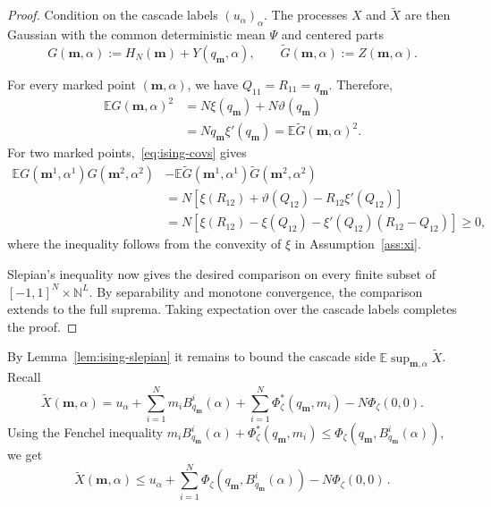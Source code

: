 \documentclass[a4paper,10pt,reqno]{amsart}
\numberwithin{equation}{section}
\newcommand{\dN}{\mathbb{N}}%
\newcommand{\dE}{\mathbb{E}}%
\newcommand{\bfm}{\mathbf{m}}
\begin{document}
	\begin{proof}
		Condition on the cascade labels $(u_\alpha)_\alpha$. The processes
		$X$ and $\widetilde X$ are then Gaussian with the common
		deterministic mean $\Psi$ and centered parts
		\[
		G(\bfm,\alpha)
		:=
		H_N(\bfm)+Y(q_\bfm,\alpha),
		\qquad
		\widetilde G(\bfm,\alpha)
		:=
		Z(\bfm,\alpha).
		\]
		
		For every marked point $(\bfm,\alpha)$, we have
		$Q_{11}=R_{11}=q_\bfm$. Therefore,
		\[
		\begin{aligned}
			\dE G(\bfm,\alpha)^2
			&=
			N\xi(q_\bfm)+N\vartheta(q_\bfm) \\
			&=
			Nq_\bfm\xi'(q_\bfm)
			=
			\dE\widetilde G(\bfm,\alpha)^2.
		\end{aligned}
		\]
		For two marked points,~\eqref{eq:ising-covs} gives
		\[
		\begin{aligned}
			\dE G(\bfm^1,\alpha^1)G(\bfm^2,\alpha^2)
			&-
			\dE\widetilde G(\bfm^1,\alpha^1)
			\widetilde G(\bfm^2,\alpha^2) \\
			&=
			N\left[
			\xi(R_{12})
			+
			\vartheta(Q_{12})
			-
			R_{12}\xi'(Q_{12})
			\right] \\
			&=
			N\left[
			\xi(R_{12})
			-
			\xi(Q_{12})
			-
			\xi'(Q_{12})(R_{12}-Q_{12})
			\right]
			\ge 0,
		\end{aligned}
		\]
		where the inequality follows from the convexity of $\xi$ in
		Assumption~\ref{ass:xi}.
		
		Slepian's inequality now gives the desired comparison on every
		finite subset of $[-1,1]^N\times\dN^L$. By separability and
		monotone convergence, the comparison extends to the full
		suprema. Taking expectation over the cascade labels completes the
		proof.
	\end{proof}
	
	By Lemma~\ref{lem:ising-slepian} it remains to bound the cascade side $\dE\sup_{\bfm,\alpha}\widetilde X$. Recall 
	\begin{equation*}
		\widetilde X(\bfm,\alpha)=u_\alpha+\sum_{i=1}^N m_i B_{q_\bfm}^i(\alpha)+\sum_{i=1}^N \Phi_\zeta^*(q_\bfm,m_i)-N\Phi_\zeta(0,0). 
	\end{equation*}
	Using the Fenchel inequality $m_i B^i_{q_\bfm}(\alpha)+\Phi_\zeta^*(q_\bfm,m_i)\le\Phi_\zeta(q_\bfm,B^i_{q_\bfm}(\alpha))$, we get
	\begin{equation}\label{eq:ising-fenchel}
		\widetilde X(\bfm,\alpha)\le u_\alpha+\sum_{i=1}^N\Phi_\zeta(q_\bfm,B^i_{q_\bfm}(\alpha))-N\Phi_\zeta(0,0)\,.
	\end{equation}
	
\end{document}
